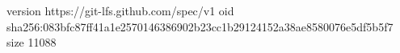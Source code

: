 version https://git-lfs.github.com/spec/v1
oid sha256:083bfc87ff41a1e2570146386902b23cc1b29124152a38ae8580076e5df5b5f7
size 11088
